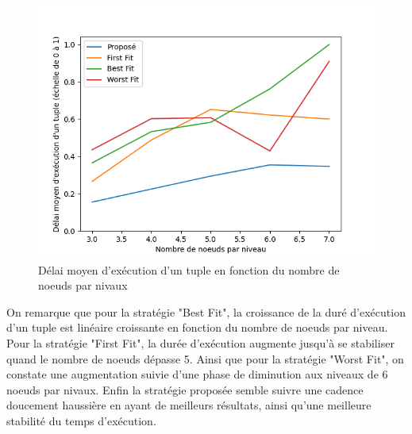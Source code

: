 \begin{figure}[H]
    \centering
    \includegraphics[]{src/ressources/tupleDelayPerLvl.png}
    \caption{Délai moyen d'exécution d’un tuple en fonction du nombre de noeuds par nivaux}
    \label{fig:}
\end{figure}
On remarque que pour la stratégie "Best Fit", la croissance de la duré d'exécution d'un tuple est linéaire croissante en fonction du nombre de noeuds par niveau. Pour la stratégie "First Fit", la durée d'exécution augmente jusqu'à se stabiliser quand le nombre de noeuds dépasse 5. Ainsi que pour la stratégie "Worst Fit", on constate une augmentation suivie d'une phase de diminution aux niveaux de 6 noeuds par nivaux. Enfin la stratégie proposée semble suivre une cadence doucement haussière en ayant de meilleurs résultats, ainsi qu'une meilleure stabilité du temps d'exécution.

